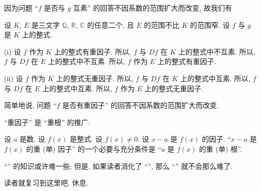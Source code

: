 因为问题 ``$f$ 是否与 $g$ 互素'' 的回答不因系数的范围扩大而改变, 故我们有
\begin{proposition}
    设 $K$, $E$ 是三文字 $\mathbb{Q}$, $\mathbb{R}$, $\mathbb{C}$ 的任意二个, 且 $E$ 的范围不比 $K$ 的范围窄. 设 $f$ 与 $g$ 是 $K$ 上的整式.

    (i) 设 $f$ 作为 $K$ 上的整式有重因子. 所以, $f$ 与 $Df$ 在 $K$ 上的整式中不互素. 所以, $f$ 与 $Df$ 在 $E$ 上的整式中不互素. 所以, $f$ 作为 $E$ 上的整式有重因子.

    (ii) 设 $f$ 作为 $K$ 上的整式无重因子. 所以, $f$ 与 $Df$ 在 $K$ 上的整式中互素. 所以, $f$ 与 $Df$ 在 $E$ 上的整式中互素. 所以, $f$ 作为 $E$ 上的整式无重因子.

    简单地说, 问题 ``$f$ 是否有重因子'' 的回答不因系数的范围扩大而改变.
\end{proposition}

``重因子'' 是 ``重根'' 的推广:
\begin{proposition}
    设 $a$ 是数. 设 $f(x)$ 是整式. 设 $f(x) \neq 0$. 设 $x - a$ 是 $f(x)$ 的因子. ``$x-a$ 是 $f(x)$ 的重 (单) 因子'' 的一个必要与充分条件是 ``$a$ 是 $f(x)$ 的重 (单) 根''.
\end{proposition}

``'' 的知识或许难一些; 但是, 如果读者消化了 ``'', 那么 ``'' 就不会那么难了.

读者就复习到这里吧. 休息.
